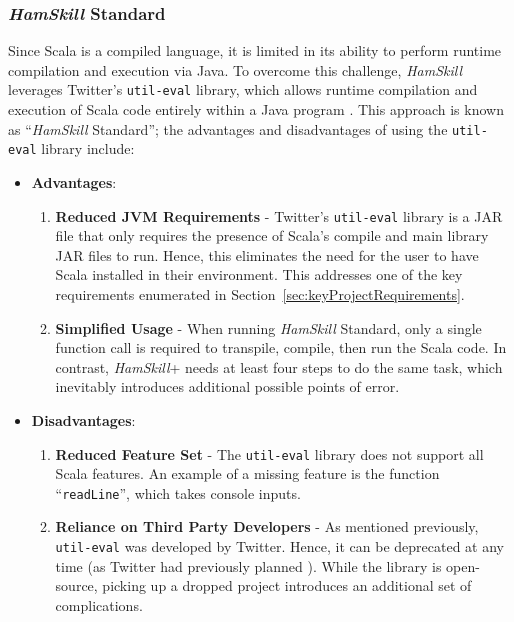 \documentclass{report}
\begin{document}
\subsubsection{\textit{HamSkill} Standard}

Since Scala is a compiled language, it is limited in its ability to perform runtime compilation and execution via Java.  To overcome this challenge, \textit{HamSkill} leverages Twitter's \texttt{util-eval} library, which allows runtime compilation and execution of Scala code entirely within a Java program \cite{githubTwitterEvalUtil}.  This approach is known as ``\textit{HamSkill} Standard''; the advantages and disadvantages of using the \texttt{util-eval} library include:

\begin{itemize}

\item \textbf{Advantages}:

\begin{enumerate}

\item \textbf{Reduced JVM Requirements} - Twitter's \texttt{util-eval} library is a JAR file that only requires the presence of Scala's compile and main library JAR files to run.  Hence, this eliminates the need for the user to have Scala installed in their environment.  This addresses one of the key requirements enumerated in Section~\ref{sec:keyProjectRequirements}.

\item \textbf{Simplified Usage} - When running \textit{HamSkill} Standard, only a single function call is required to transpile, compile, then run the Scala code.  In contrast, \textit{HamSkill}+ needs at least four steps to do the same task, which inevitably introduces additional possible points of error.

\end{enumerate}

\item \textbf{Disadvantages}:

\begin{enumerate}

\item \textbf{Reduced Feature Set} - The \texttt{util-eval} library does not support all Scala features.  An example of a missing feature is the function ``\texttt{readLine}'', which takes console inputs.

\item \textbf{Reliance on Third Party Developers} - As mentioned previously, \texttt{util-eval} was developed by Twitter.  Hence, it can be deprecated at any time (as Twitter had previously planned \cite{deprecateUtilEval}).  While the library is open-source, picking up a dropped project introduces an additional set of complications.

\end{enumerate}

\end{itemize}
\end{document}
